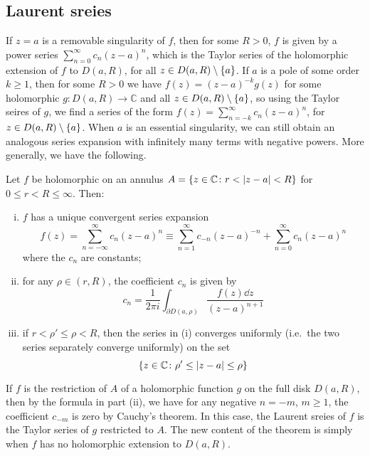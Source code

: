 \subsection{Laurent sreies}
If \( z = a \) is a removable singularity of \( f \), then for some \( R > 0 \), \( f \) is given by a power series \( \sum_{n = 0}^\infty c_n(z-a)^n \), which is the Taylor series of the holomorphic extension of \( f \) to \( D(a,R) \), for all \( z \in D(a,R) \setminus \qty{a} \).
If \( a \) is a pole of some order \( k \geq 1 \), then for some \( R > 0 \) we have \( f(z) = (z-a)^{-k} g(z) \) for some holomorphic \( g \colon D(a,R) \to \mathbb C \) and all \( z \in D(a,R) \setminus \qty{a} \), so using the Taylor seires of \( g \), we find a series of the form \( f(z) = \sum_{n=-k}^\infty c_n (z-a)^n \), for \( z \in D(a,R) \setminus \qty{a} \).
When \( a \) is an essential singularity, we can still obtain an analogous series expansion with infinitely many terms with negative powers.
More generally, we have the following.
\begin{theorem}
	Let \( f \) be holomorphic on an annulus \( A = \qty{z \in \mathbb C \colon r < \abs{z-a} < R} \) for \( 0 \leq r < R \leq \infty \).
	Then:
	\begin{enumerate}[(i)]
		\item \( f \) has a unique convergent series expansion
			\[ f(z) = \sum_{n = -\infty}^\infty c_n (z-a)^n \equiv \sum_{n=1}^\infty c_{-n} (z-a)^{-n} + \sum_{n=0}^\infty c_n (z-a)^n \]
			where the \( c_n \) are constants;
		\item for any \( \rho \in (r,R) \), the coefficient \( c_n \) is given by
			\[ c_n = \frac{1}{2 \pi i} \int_{\partial D(a,\rho)} \frac{f(z) \dd{z}}{(z-a)^{n+1}} \]
		\item if \( r < \rho' \leq \rho < R \), then the series in (i) converges uniformly (i.e.\ the two series separately converge uniformly) on the set
			\[ \qty{z \in \mathbb C \colon \rho' \leq \abs{z-a} \leq \rho} \]
	\end{enumerate}
\end{theorem}
\begin{remark}
	If \( f \) is the restriction of \( A \) of a holomorphic function \( g \) on the full disk \( D(a,R) \), then by the formula in part (ii), we have for any negative \( n = -m \), \( m \geq 1 \), the coefficient \( c_{-m} \) is zero by Cauchy's theorem.
	In this case, the Laurent sreies of \( f \) is the Taylor series of \( g \) restricted to \( A \).
	The new content of the theorem is simply when \( f \) has no holomorphic extension to \( D(a,R) \).
\end{remark}
